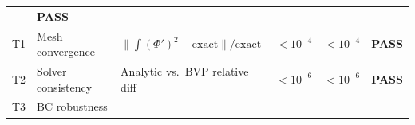 \documentclass[
  11pt,
]{article}
\begin{document}
\begin{longtable}[]{@{}llllll@{}}
\begin{minipage}[t]{0.14\columnwidth}
\end{minipage} & \begin{minipage}[t]{0.14\columnwidth}\raggedright
\textbf{PASS}\strut
\end{minipage}\tabularnewline
\begin{minipage}[t]{0.14\columnwidth}\raggedright
T1\strut
\end{minipage} & \begin{minipage}[t]{0.14\columnwidth}\raggedright
Mesh convergence\strut
\end{minipage} & \begin{minipage}[t]{0.14\columnwidth}\raggedright
\(\lVert\int(\Phi')^2 - \text{exact}\rVert / \text{exact}\)\strut
\end{minipage} & \begin{minipage}[t]{0.14\columnwidth}\raggedright
\(< 10^{-4}\)\strut
\end{minipage} & \begin{minipage}[t]{0.14\columnwidth}\raggedright
\(< 10^{-4}\)\strut
\end{minipage} & \begin{minipage}[t]{0.14\columnwidth}\raggedright
\textbf{PASS}\strut
\end{minipage}\tabularnewline
\begin{minipage}[t]{0.14\columnwidth}\raggedright
T2\strut
\end{minipage} & \begin{minipage}[t]{0.14\columnwidth}\raggedright
Solver consistency\strut
\end{minipage} & \begin{minipage}[t]{0.14\columnwidth}\raggedright
Analytic vs.~BVP relative diff\strut
\end{minipage} & \begin{minipage}[t]{0.14\columnwidth}\raggedright
\(< 10^{-6}\)\strut
\end{minipage} & \begin{minipage}[t]{0.14\columnwidth}\raggedright
\(< 10^{-6}\)\strut
\end{minipage} & \begin{minipage}[t]{0.14\columnwidth}\raggedright
\textbf{PASS}\strut
\end{minipage}\tabularnewline
\begin{minipage}[t]{0.14\columnwidth}\raggedright
T3\strut
\end{minipage} & \begin{minipage}[t]{0.14\columnwidth}\raggedright
BC robustness\strut
\end{minipage} & \begin{minipage}[t]{0.14\columnwidth}\raggedright

\end{minipage}
\end{longtable}
\end{document}
